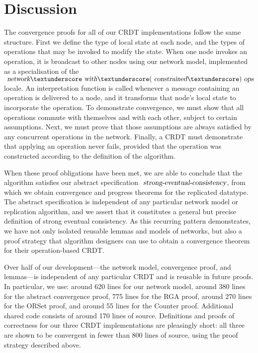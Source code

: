 \documentclass[acmlarge,review,anonymous]{acmart}
\begin{document}
\section{Discussion}
\label{sect.discussion}

The convergence proofs for all of our CRDT implementations follow the same structure.
First we define the type of local state at each node, and the types of operations that may be invoked to modify the state.
When one node invokes an operation, it is broadcast to other nodes using our network model, implemented as a specialisation of the $\isa{network}{\isacharunderscore}\isa{with}{\isacharunderscore}(\isa{constrained}{\isacharunderscore})\isa{ops}$ locale.
An interpretation function is called whenever a message containing an operation is delivered to a node, and it transforms that node's local state to incorporate the operation.
To demonstrate convergence, we must show that all operations commute with themselves and with each other, subject to certain assumptions.
Next, we must prove that those assumptions are always satisfied by any concurrent operations in the network.
Finally, a CRDT must demonstrate that applying an operation never fails, provided that the operation was constructed according to the definition of the algorithm.

When these proof obligations have been met, we are able to conclude that the algorithm satisfies our abstract specification $\isa{strong-eventual-consistency}$, from which we obtain convergence and progress theorems for the replicated datatype.
The abstract specification is independent of any particular network model or replication algorithm, and we assert that it constitutes a general but precise definition of strong eventual consistency.
As this recurring pattern demonstrates, we have not only isolated reusable lemmas and models of networks, but also a proof strategy that algorithm designers can use to obtain a convergence theorem for their operation-based CRDT.

Over half of our development---the network model, convergence proof, and lemmas---is independent of any particular CRDT and is reusable in future proofs.
In particular, we use: around 620 lines for our network model, around 380 lines for the abstract convergence proof, 775 lines for the RGA proof, around 270 lines for the ORSet proof, and around 55 lines for the Counter proof.
Additional shared code consists of around 170 lines of source.
Definitions and proofs of correctness for our three CRDT implementations are pleasingly short: all three are shown to be convergent in fewer than 800 lines of source, using the proof strategy described above. 
\end{document}
